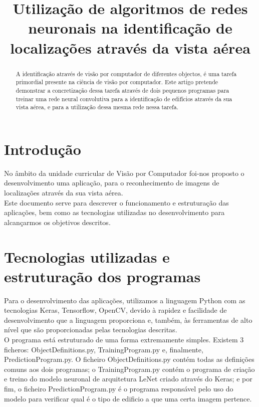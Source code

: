 \documentclass[extendedabs]{vcom}
\title{Utilização de algoritmos de redes neuronais na identificação de localizações através da vista aérea}
\begin{document}
\maketitle

\begin{abstract}
A identificação através de visão por computador de diferentes objectos, é uma tarefa primordial presente na ciência de visão por computador. Este artigo pretende demonstrar a concretização dessa tarefa através de dois pequenos programas para treinar uma rede neural convolutiva para a identificação de edifícios através da sua vista aérea, e para a utilização dessa mesma rede nessa tarefa.
\end{abstract}

\section{Introdução}
No âmbito da unidade curricular de Visão por Computador foi-nos proposto o desenvolvimento uma aplicação, para o reconhecimento de imagens de localizações através da sua vista aérea. \\
Este documento serve para descrever o funcionamento e estruturação das aplicações, bem como as tecnologias utilizadas no desenvolvimento para alcançarmos os objetivos descritos. \\

\section{Tecnologias utilizadas e estruturação dos programas}

Para o desenvolvimento das aplicações, utilizamos a linguagem Python com as tecnologias Keras, Tensorflow, OpenCV, devido à rapidez e facilidade de desenvolvimento que a linguagem proporciona e, também, às ferramentas de alto nível que são proporcionadas pelas tecnologias descritas. \\
O programa está estruturado de uma forma extremamente simples. Existem 3 ficheros: ObjectDefinitions.py, TrainingProgram.py e, finalmente, PredictionProgram.py. O ficheiro ObjectDefinitions.py contém todas as definições comuns aos dois programas; o TrainingProgram.py contém o programa de criação e treino do modelo neuronal de arquitetura LeNet criado através do Keras; e por fim, o ficheiro PredictionProgram.py é o programa responsável pelo uso do modelo para verificar qual é o tipo de edificio a que uma certa imagem pertence. \\
\end{document}
